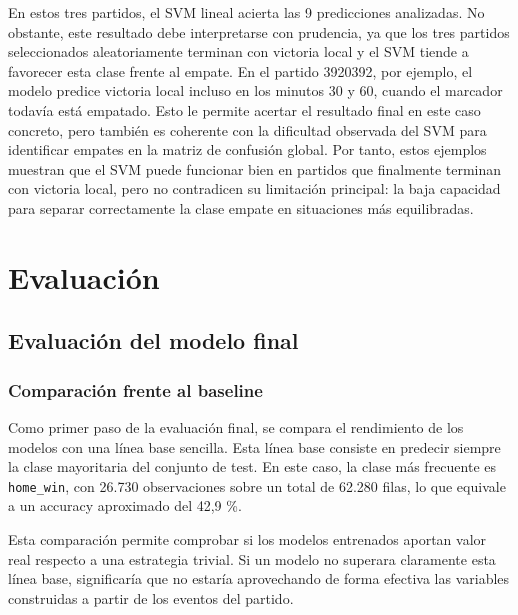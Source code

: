 En estos tres partidos, el SVM lineal acierta las 9 predicciones analizadas. No obstante, este resultado debe interpretarse con prudencia, ya que los tres partidos seleccionados aleatoriamente terminan con victoria local y el SVM tiende a favorecer esta clase frente al empate. En el partido 3920392, por ejemplo, el modelo predice victoria local incluso en los minutos 30 y 60, cuando el marcador todavía está empatado. Esto le permite acertar el resultado final en este caso concreto, pero también es coherente con la dificultad observada del SVM para identificar empates en la matriz de confusión global. Por tanto, estos ejemplos muestran que el SVM puede funcionar bien en partidos que finalmente terminan con victoria local, pero no contradicen su limitación principal: la baja capacidad para separar correctamente la clase empate en situaciones más equilibradas.

\section{Evaluación}

\subsection{Evaluación del modelo final}

\subsubsection*{Comparación frente al baseline}

Como primer paso de la evaluación final, se compara el rendimiento de los modelos con una línea base sencilla. Esta línea base consiste en predecir siempre la clase mayoritaria del conjunto de test. En este caso, la clase más frecuente es \texttt{home\_win}, con 26.730 observaciones sobre un total de 62.280 filas, lo que equivale a un accuracy aproximado del 42,9 \%.

Esta comparación permite comprobar si los modelos entrenados aportan valor real respecto a una estrategia trivial. Si un modelo no superara claramente esta línea base, significaría que no estaría aprovechando de forma efectiva las variables construidas a partir de los eventos del partido.

